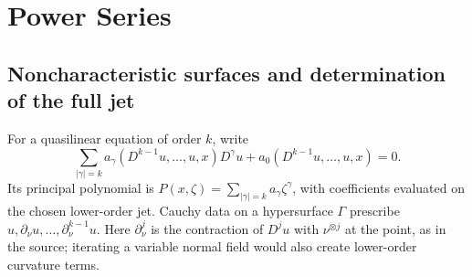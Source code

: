 \Needspace{65mm}
\section{Power Series}\label{sec:4-6}
\Needspace{35mm}
\subsection{Noncharacteristic surfaces and determination of the full jet}
For a quasilinear equation of order $k$, write
\[
 \sum_{|\gamma|=k}a_\gamma(D^{k-1}u,\ldots,u,x)D^\gamma u
                     +a_0(D^{k-1}u,\ldots,u,x)=0 .
\]
Its principal polynomial is
$P(x,\zeta)=\sum_{|\gamma|=k}a_\gamma\zeta^\gamma$,
with coefficients evaluated on the chosen lower-order jet.
Cauchy data on a hypersurface $\Gamma$ prescribe
$u,\partial_\nu u,\ldots,\partial_\nu^{k-1}u$.
Here $\partial_\nu^j$ is the contraction of $D^ju$ with $\nu^{\otimes j}$
at the point, as in the source; iterating a variable normal field
would also create lower-order curvature terms.

